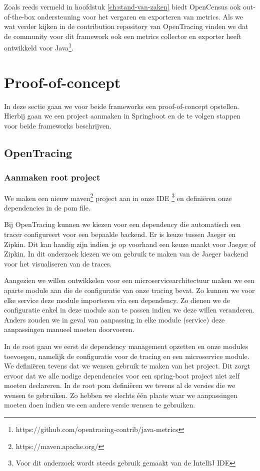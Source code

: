 Zoals reeds vermeld in hoofdstuk \ref{ch:stand-van-zaken} biedt OpenCensus ook out-of-the-box ondersteuning voor het vergaren en exporteren van metrics. Als we wat verder kijken in de contribution repository van OpenTracing vinden we dat de community voor dit framework ook een metrics collector en exporter heeft ontwikkeld voor Java\footnote{https://github.com/opentracing-contrib/java-metrics}.

\section{Proof-of-concept}
In deze sectie gaan we voor beide frameworks een proof-of-concept opstellen. Hierbij gaan we een project aanmaken in Springboot en de te volgen stappen voor beide frameworks beschrijven.

\subsection{OpenTracing}
\subsubsection{Aanmaken root project}
We maken een nieuw maven\footnote{https://maven.apache.org/} project aan in onze IDE \footnote{Voor dit onderzoek wordt steeds gebruik gemaakt van de IntelliJ IDE} en definiëren onze dependencies in de pom file.

Bij OpenTracing kunnen we kiezen voor een dependency die automatisch een tracer configureert voor een bepaalde backend. Er is keuze tussen Jaeger en Zipkin. Dit kan handig zijn indien je op voorhand een keuze maakt voor Jaeger of Zipkin. In dit onderzoek kiezen we om gebruik te maken van de Jaeger backend voor het visualiseren van de traces.

Aangezien we willen ontwikkelen voor een microservicearchitectuur maken we een aparte module aan die de configuratie van onze tracing bevat. Zo kunnen we voor elke service deze module importeren via een dependency. Zo dienen we de configuratie enkel in deze module aan te passen indien we deze willen veranderen. Anders zouden we in geval van aanpassing in elke module (service) deze aanpassingen manueel moeten doorvoeren.

In de root  gaan we eerst de dependency management opzetten en onze modules toevoegen, namelijk de configuratie voor de tracing en een microservice module. We defini\"{e}ren tevens dat we wensen gebruik te maken van het  project. Dit zorgt ervoor dat we alle nodige dependencies voor een spring-boot project niet zelf moeten declareren. In de root pom defini\"{e}ren we tevens al de versies die we wensen te gebruiken. Zo hebben we slechts \'{e}\'{e}n plaats waar we aanpassingen moeten doen indien we een andere versie wensen te gebruiken.

